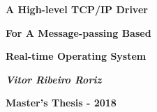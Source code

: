 \documentclass{article}
\begin{document}
\titlepage
\begin{center}
\vspace*{12\baselineskip}
\centerline{\Huge \textbf{A High-level TCP/IP Driver}}
\vspace{10pt}
\centerline{\Huge \textbf{For A Message-passing Based}}
\vspace{10pt}
\centerline{\Huge \textbf{Real-time Operating System}}



\vspace*{10\baselineskip}
{\Huge \textbf{\textit{Vitor Ribeiro Roriz}}}


\vspace*{28\baselineskip}
{\Huge \textbf{Master's Thesis - 2018}}
\end{center}
\end{document}
